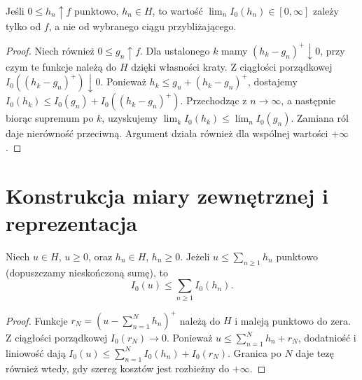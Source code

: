 \begin{lemat}\label{it:lem:daniell-monotone-extension}
Jeśli $0\le h_n\uparrow f$ punktowo, $h_n\in H$, to wartość $\lim_n I_0(h_n)\in[0,\infty]$ zależy tylko od $f$, a nie od wybranego ciągu przybliżającego.
\end{lemat}
\begin{proof}
Niech również $0\le g_n\uparrow f$. Dla ustalonego $k$ mamy $(h_k-g_n)^+\downarrow0$, przy czym te funkcje należą do $H$ dzięki własności kraty. Z ciągłości porządkowej $I_0((h_k-g_n)^+)\downarrow0$. Ponieważ $h_k\le g_n+(h_k-g_n)^+$, dostajemy $I_0(h_k)\le I_0(g_n)+I_0((h_k-g_n)^+)$. Przechodząc z $n\to\infty$, a następnie biorąc supremum po $k$, uzyskujemy $\lim_kI_0(h_k)\le\lim_nI_0(g_n)$. Zamiana ról daje nierówność przeciwną. Argument działa również dla wspólnej wartości $+\infty$.
\end{proof}
\section{Konstrukcja miary zewnętrznej i reprezentacja}
\begin{lemat}\label{it:lem:daniell-cover-domination}
Niech $u\in H$, $u\ge0$, oraz $h_n\in H$, $h_n\ge0$. Jeżeli $u\le\sum_{n\ge1}h_n$ punktowo (dopuszczamy nieskończoną sumę), to
\[
 I_0(u)\le\sum_{n\ge1}I_0(h_n).
\]
\end{lemat}
\begin{proof}
Funkcje $r_N=(u-\sum_{n=1}^N h_n)^+$ należą do $H$ i maleją punktowo do zera. Z ciągłości porządkowej $I_0(r_N)\to0$. Ponieważ $u\le\sum_{n=1}^N h_n+r_N$, dodatniość i liniowość dają
$I_0(u)\le\sum_{n=1}^N I_0(h_n)+I_0(r_N)$. Granica po $N$ daje tezę również wtedy, gdy szereg kosztów jest rozbieżny do $+\infty$.
\end{proof}

